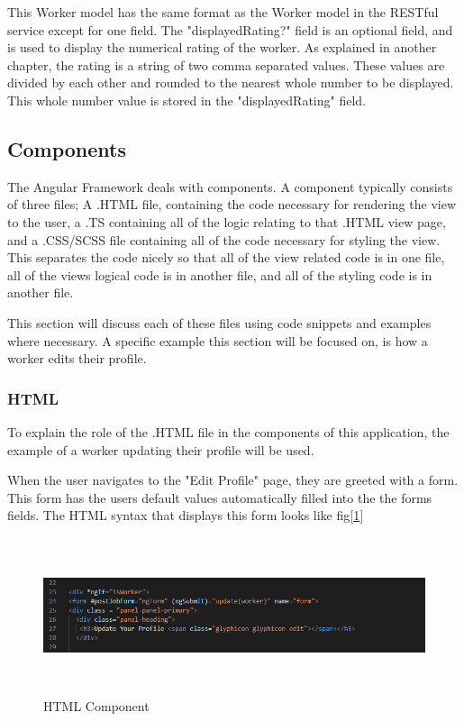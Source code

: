 \bigskip

This Worker model has the same format as the Worker model in the RESTful service except for one field. The "displayedRating?" field is an optional field, and is used to display the numerical rating of the worker. As explained in another chapter, the rating is a string of two comma separated values. These values are divided by each other and rounded to the nearest whole number to be displayed. This whole number value is stored in the "displayedRating" field. 


\subsection{Components}
\label{sec:SystemDesignComponents}

The Angular Framework deals with components. A component typically consists of three files; A .HTML file, containing the code necessary for rendering the view to the user, a .TS containing all of the logic relating to that .HTML view page, and a .CSS/SCSS file containing all of the code necessary for styling the view. This separates the code nicely so that all of the view related code is in one file, all of the views logical code is in another file, and all of the styling code is in another file. 

This section will discuss each of these files using code snippets and examples where necessary. A specific example this section will be focused on, is how a worker edits their profile.

\subsubsection{HTML}
\label{sec:SystemDesignHTML}
To explain the role of the .HTML file in the components of this application, the example of a worker updating their profile will be used. 

\bigskip

When the user navigates to the "Edit Profile" page, they are greeted with a form. This form has the users default values automatically filled into the the forms fields. The HTML syntax that displays this form looks like fig[\ref{fig:htmlComponent}]

\begin{figure}[H]
    \centering
    \includegraphics[width=\textwidth, height=130pt]{DesignImages/edit-ProfileView.PNG}
    \caption{HTML Component}
    \label{fig:htmlComponent}
\end{figure}

